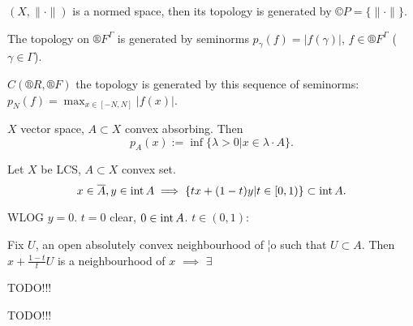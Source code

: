 \documentclass[12pt]{article}					%
\begin{document}
\begin{priklady}
	$(X, \|·\|)$ is a normed space, then its topology is generated by $©P = \{\|·\|\}$.

	The topology on $®F^Γ$ is generated by seminorms $p_γ(f) = |f(γ)|$, $f \in ®F^Γ$ ($γ \in Γ$).

	$C(®R, ®F)$ the topology is generated by this sequence of seminorms: $p_N(f) = \max_{x \in [-N, N]} |f(x)|$.
\end{priklady}

\begin{definice}
	$X$ vector space, $A \subset X$ convex absorbing. Then
	$$ p_A(x) := \inf \{λ > 0 | x \in λ·A\}. $$
\end{definice}

\begin{lemma}
	Let $X$ be LCS, $A \subset X$ convex set.
	$$ x \in \overline{A}, y \in \operatorname{int} A \implies \{tx + (1 - t)y | t \in [0, 1)\} \subset \operatorname{int} A. $$

	\begin{dukazin}
		WLOG $y = 0$. $t = 0$ clear, $0 \in \operatorname{int} A$. $t \in (0, 1)$:

		Fix $U$, an open absolutely convex neighbourhood of ¦o such that $U \subset A$. Then $x + \frac{1 - t}{t} U$ is a neighbourhood of $x$ $\implies$ $\exists $

		TODO!!!
	\end{dukazin}
\end{lemma}

TODO!!!
\end{document}
